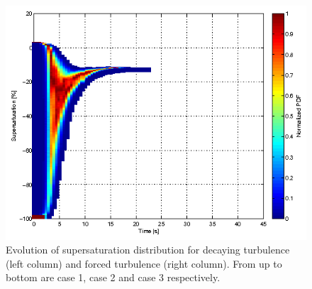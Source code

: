 \begin{figure}[!htbp]
\includegraphics[width=0.48\linewidth]{Figures/pdf_supersat_f3}
\caption{Evolution of supersaturation distribution for decaying turbulence (left column) 
and forced turbulence (right column). From up to bottom are case 1, case 2 and case 3 respectively.}\label{fig:supersat_distri}
\end{figure}

